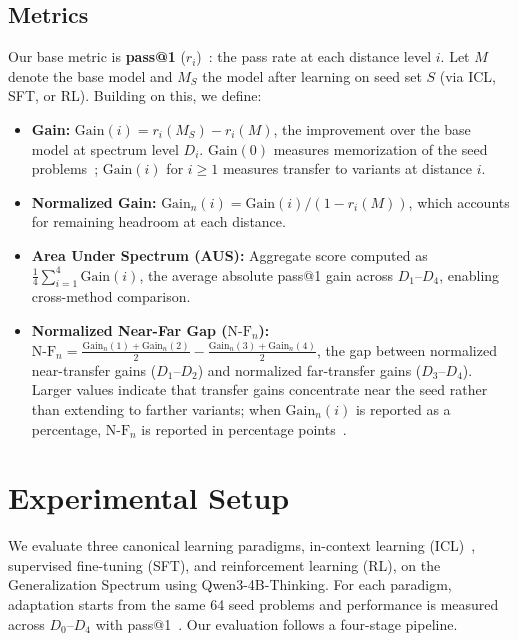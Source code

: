 \documentclass[]{bytedance_seed}
\theoremstyle{plain}
\theoremstyle{definition}
\theoremstyle{remark}
\begin{document}
\subsection{Metrics}
\label{subsec:metrics}

Our base metric is \textbf{pass@1} ($r_i$)~\citep{chen2021evaluating}: the pass rate at each distance level $i$. Let $M$ denote the base model and $M_S$ the model after learning on seed set $S$ (via ICL, SFT, or RL). Building on this, we define:

\begin{itemize}[leftmargin=*,itemsep=2pt]
    \item \textbf{Gain:} $\text{Gain}(i) = r_i(M_S) - r_i(M)$, the improvement over the base model at spectrum level $D_i$. $\text{Gain}(0)$ measures memorization of the seed problems~\citep{arpit2017memorization}; $\text{Gain}(i)$ for $i \ge 1$ measures transfer to variants at distance $i$.
    \item \textbf{Normalized Gain:} $\text{Gain}_n(i) = \text{Gain}(i) / (1 - r_i(M))$, which accounts for remaining headroom at each distance.
    \item \textbf{Area Under Spectrum (AUS):} Aggregate score computed as $\frac{1}{4}\sum_{i=1}^{4}\text{Gain}(i)$, the average absolute pass@1 gain across $D_1$--$D_4$, enabling cross-method comparison.
    \item \textbf{Normalized Near-Far Gap ($\text{N-F}_n$):} $\text{N-F}_n = \frac{\text{Gain}_n(1)+\text{Gain}_n(2)}{2} - \frac{\text{Gain}_n(3)+\text{Gain}_n(4)}{2}$, the gap between normalized near-transfer gains ($D_1$--$D_2$) and normalized far-transfer gains ($D_3$--$D_4$). Larger values indicate that transfer gains concentrate near the seed rather than extending to farther variants; when $\text{Gain}_n(i)$ is reported as a percentage, $\text{N-F}_n$ is reported in percentage points~\citep{barnett2002taxonomy}.
\end{itemize}




\section{Experimental Setup}
\label{sec:experimental-setup}

We evaluate three canonical learning paradigms, in-context learning (ICL)~\citep{brown2020language,dong2024survey}, supervised fine-tuning (SFT), and reinforcement learning (RL), on the Generalization Spectrum using Qwen3-4B-Thinking. For each paradigm, adaptation starts from the same 64 seed problems and performance is measured across $D_0$--$D_4$ with pass@1~\citep{chen2021evaluating}. Our evaluation follows a four-stage pipeline.
\end{document}
